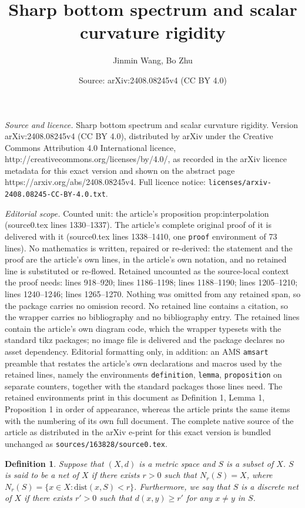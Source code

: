 \documentclass[10pt,a4paper]{amsart}
\title{Sharp bottom spectrum and scalar curvature rigidity}
\author{Jinmin Wang, Bo Zhu}
\date{Source: arXiv:2408.08245v4 (CC BY 4.0)}
\newtheorem{definition}{Definition}
\newcommand{\dist}{\mathrm{dist}}
\begin{document}
\maketitle

\noindent\emph{Source and licence.} Sharp bottom spectrum and scalar curvature rigidity. Version arXiv:2408.08245v4 (CC BY 4.0), distributed by arXiv under the Creative Commons Attribution 4.0 International licence, http://creativecommons.org/licenses/by/4.0/, as recorded in the arXiv licence metadata for this exact version and shown on the abstract page https://arxiv.org/abs/2408.08245v4. Full licence notice: \texttt{licenses/arxiv-2408.08245-CC-BY-4.0.txt}.\par\smallskip

\noindent\textit{Editorial scope.} Counted unit: the article's proposition prop:interpolation (source0.tex lines 1330--1337). The article's complete original proof of it is delivered with it (source0.tex lines 1338--1410, one \texttt{proof} environment of 73 lines). No mathematics is written, repaired or re-derived: the statement and the proof are the article's own lines, in the article's own notation, and no retained line is substituted or re-flowed.  Retained uncounted as the source-local context the proof needs: lines 918--920; lines 1186--1198; lines 1188--1190; lines 1205--1210; lines 1240--1246; lines 1265--1270.  Nothing was omitted from any retained span, so the package carries no omission record.  No retained line contains a citation, so the wrapper carries no bibliography and no bibliography entry.  The retained lines contain the article's own diagram code, which the wrapper typesets with the standard tikz packages; no image file is delivered and the package declares no asset dependency.  Editorial formatting only, in addition: an AMS \texttt{amsart} preamble that restates the article's own declarations and macros used by the retained lines, namely the environments \texttt{definition}, \texttt{lemma}, \texttt{proposition} on separate counters, together with the standard packages those lines need.  The retained environments print in this document as Definition 1, Lemma 1, Proposition 1 in order of appearance, whereas the article prints the same items with the numbering of its own full document.  The complete native source of the article as distributed in the arXiv e-print for this exact version is bundled unchanged as \texttt{sources/163828/source0.tex}.
\begin{definition}\label{def:net}
	Suppose that  $(X, d)$ is a metric space and $S$ is a subset of $X$. $S$ is said to be  a \emph{net} of $X$ if there exists $r>0$ such that $N_r(S)=X$, where $N_r(S) = \{x \in X: \dist(x, S) < r\}$. Furthermore, we say that $S$ is a \emph{discrete net} of $X$ if there exists $r'>0$ such that $d(x,y)\geq r'$ for any $x\ne y$ in $S$.
\end{definition}
\end{document}
